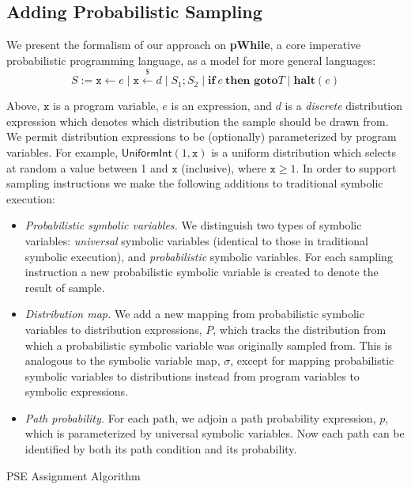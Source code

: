 \subsection{Adding Probabilistic Sampling}
We present the formalism of our approach on \textbf{pWhile}, a core imperative probabilistic programming language, as a model for more general languages:
% 
\[
S := \mathtt{x} \leftarrow e \mid \mathtt{x} \xleftarrow{\$} d \mid S_1 ; S_2 \mid \mathbf{if}~e~\textbf{then goto} T \mid \textbf{halt}(e)
\]

Above, $\mathtt{x}$ is a program variable, $e$ is an expression, and $d$ is a \textit{discrete} distribution expression which denotes which distribution the sample should be drawn from.
% 
We permit distribution expressions to be (optionally) parameterized by program variables.
% 
For example, $\mathsf{UniformInt}(1,\mathtt{x})$ is a uniform distribution which selects at random a value between 1 and $\mathtt{x}$ (inclusive), where $\mathtt{x} \geq 1$.
% 
In order to support sampling instructions we make the following additions to traditional symbolic execution:
% 
\begin{itemize}
	\item \textit{Probabilistic symbolic variables.} We distinguish two types of symbolic variables: \textit{universal} symbolic variables (identical to those in traditional symbolic execution), and \textit{probabilistic} symbolic variables.
	For each sampling instruction a new probabilistic symbolic variable is created to denote the result of sample.
	\item \textit{Distribution map.} We add a new mapping from probabilistic symbolic variables to distribution expressions, $P$, which tracks the distribution from which a probabilistic symbolic variable was originally sampled from.
	This is analogous to the symbolic variable map, $\sigma$, except for mapping probabilistic symbolic variables to distributions instead from program variables to symbolic expressions.
	\item \textit{Path probability.} For each path, we adjoin a path probability expression, $p$, which is parameterized by universal symbolic variables.
	Now each path can be identified by both its path condition and its probability.
\end{itemize}

\begin{algorithm}[H]
	\caption{PSE Assignment Algorithm}
	\label{alg:assign}
	\begin{algorithmic}[1]
		\State{}
		\EndFunction
	\end{algorithmic}
\end{algorithm}

